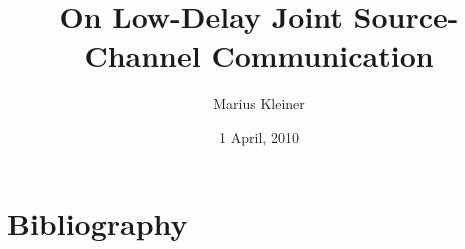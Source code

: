 \documentclass[a4paper]{book}
\title{On Low-Delay Joint Source-Channel Communication}
\author{Marius Kleiner}
\date{1 April, 2010}
\begin{document}
\frontmatter
\maketitle







\tableofcontents

\mainmatter






\backmatter
\chapter{Bibliography}

\end{document}
